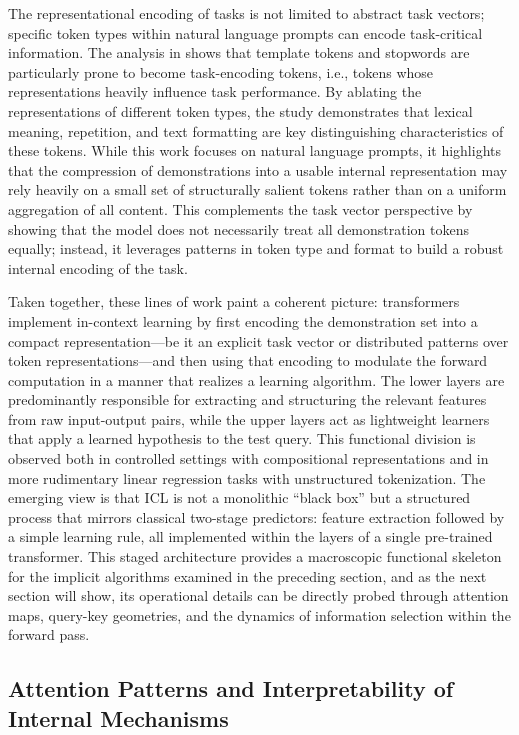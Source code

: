 \documentclass[11pt]{article}
\begin{document}
The representational encoding of tasks is not limited to abstract task vectors; specific token types within natural language prompts can encode task-critical information. The analysis in \cite{ref63} shows that template tokens and stopwords are particularly prone to become task-encoding tokens, i.e., tokens whose representations heavily influence task performance. By ablating the representations of different token types, the study demonstrates that lexical meaning, repetition, and text formatting are key distinguishing characteristics of these tokens. While this work focuses on natural language prompts, it highlights that the compression of demonstrations into a usable internal representation may rely heavily on a small set of structurally salient tokens rather than on a uniform aggregation of all content. This complements the task vector perspective by showing that the model does not necessarily treat all demonstration tokens equally; instead, it leverages patterns in token type and format to build a robust internal encoding of the task.

Taken together, these lines of work paint a coherent picture: transformers implement in-context learning by first encoding the demonstration set into a compact representation---be it an explicit task vector or distributed patterns over token representations---and then using that encoding to modulate the forward computation in a manner that realizes a learning algorithm. The lower layers are predominantly responsible for extracting and structuring the relevant features from raw input-output pairs, while the upper layers act as lightweight learners that apply a learned hypothesis to the test query. This functional division is observed both in controlled settings with compositional representations and in more rudimentary linear regression tasks with unstructured tokenization. The emerging view is that ICL is not a monolithic ``black box'' but a structured process that mirrors classical two-stage predictors: feature extraction followed by a simple learning rule, all implemented within the layers of a single pre-trained transformer. This staged architecture provides a macroscopic functional skeleton for the implicit algorithms examined in the preceding section, and as the next section will show, its operational details can be directly probed through attention maps, query-key geometries, and the dynamics of information selection within the forward pass.

\subsection{Attention Patterns and Interpretability of Internal Mechanisms}
\end{document}
